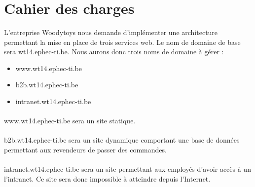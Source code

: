 \documentclass[a4paper,12pt]{article}
\begin{document}

\clearpage

\section{Cahier des charges}
	\paragraph{} L'entreprise Woodytoys nous demande d'implémenter une architecture permettant la mise en place de trois services web. Le nom de domaine de base sera wt14.ephec-ti.be. Nous aurons donc trois noms de domaine à gérer : \begin{itemize}
	\item www.wt14.ephec-ti.be
	\item b2b.wt14.ephec-ti.be
	\item intranet.wt14.ephec-ti.be
	\end{itemize}
	\paragraph{} www.wt14.ephec-ti.be sera un site statique.
	\paragraph{} b2b.wt14.ephec-ti.be sera un site dynamique comportant une base de données permettant aux revendeurs de passer des commandes.
	\paragraph{} intranet.wt14.ephec-ti.be sera un site permettant aux employés d'avoir accès à un l'intranet. Ce site sera donc impossible à atteindre depuis l'Internet.
	
\end{document}
